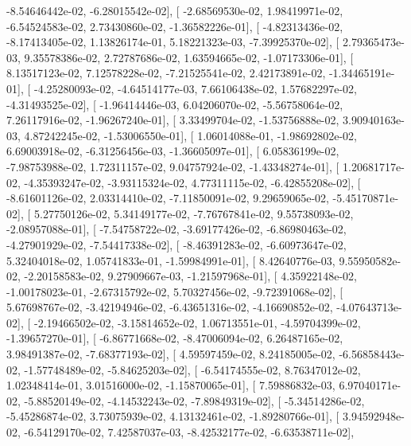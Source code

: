\documentclass{article}
\begin{document}
         -8.54646442e-02,  -6.28015542e-02],
       [ -2.68569530e-02,   1.98419971e-02,  -6.54524583e-02,
          2.73430860e-02,  -1.36582226e-01],
       [ -4.82313436e-02,  -8.17413405e-02,   1.13826174e-01,
          5.18221323e-03,  -7.39925370e-02],
       [  2.79365473e-03,   9.35578386e-02,   2.72787686e-02,
          1.63594665e-02,  -1.07173306e-01],
       [  8.13517123e-02,   7.12578228e-02,  -7.21525541e-02,
          2.42173891e-02,  -1.34465191e-01],
       [ -4.25280093e-02,  -4.64514177e-03,   7.66106438e-02,
          1.57682297e-02,  -4.31493525e-02],
       [ -1.96414446e-03,   6.04206070e-02,  -5.56758064e-02,
          7.26117916e-02,  -1.96267240e-01],
       [  3.33499704e-02,  -1.53756888e-02,   3.90940163e-03,
          4.87242245e-02,  -1.53006550e-01],
       [  1.06014088e-01,  -1.98692802e-02,   6.69003918e-02,
         -6.31256456e-03,  -1.36605097e-01],
       [  6.05836199e-02,  -7.98753988e-02,   1.72311157e-02,
          9.04757924e-02,  -1.43348274e-01],
       [  1.20681717e-02,  -4.35393247e-02,  -3.93115324e-02,
          4.77311115e-02,  -6.42855208e-02],
       [ -8.61601126e-02,   2.03314410e-02,  -7.11850091e-02,
          9.29659065e-02,  -5.45170871e-02],
       [  5.27750126e-02,   5.34149177e-02,  -7.76767841e-02,
          9.55738093e-02,  -2.08957088e-01],
       [ -7.54758722e-02,  -3.69177426e-02,  -6.86980463e-02,
         -4.27901929e-02,  -7.54417338e-02],
       [ -8.46391283e-02,  -6.60973647e-02,   5.32404018e-02,
          1.05741833e-01,  -1.59984991e-01],
       [  8.42640776e-03,   9.55950582e-02,  -2.20158583e-02,
          9.27909667e-03,  -1.21597968e-01],
       [  4.35922148e-02,  -1.00178023e-01,  -2.67315792e-02,
          5.70327456e-02,  -9.72391068e-02],
       [  5.67698767e-02,  -3.42194946e-02,  -6.43651316e-02,
         -4.16690852e-02,  -4.07643713e-02],
       [ -2.19466502e-02,  -3.15814652e-02,   1.06713551e-01,
         -4.59704399e-02,  -1.39657270e-01],
       [ -6.86771668e-02,  -8.47006094e-02,   6.26487165e-02,
          3.98491387e-02,  -7.68377193e-02],
       [  4.59597459e-02,   8.24185005e-02,  -6.56858443e-02,
         -1.57748489e-02,  -5.84625203e-02],
       [ -6.54174555e-02,   8.76347012e-02,   1.02348414e-01,
          3.01516000e-02,  -1.15870065e-01],
       [  7.59886832e-03,   6.97040171e-02,  -5.88520149e-02,
         -4.14532243e-02,  -7.89849319e-02],
       [ -5.34514286e-02,  -5.45286874e-02,   3.73075939e-02,
          4.13132461e-02,  -1.89280766e-01],
       [  3.94592948e-02,  -6.54129170e-02,   7.42587037e-03,
         -8.42532177e-02,  -6.63538711e-02],
\end{document}
